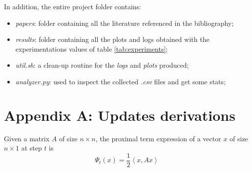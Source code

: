 \documentclass[notitlepage]{article}
\begin{document}
In addition, the entire project folder contains:
\begin{itemize}
  \item \textit{papers}: folder containing all the literature referenced in the bibliography;
  \item \textit{results}: folder containing all the plots and logs obtained with the experimentations values of table \ref{tab:experiments};
  \item \textit{util.sh}: a clean-up routine for the \textit{logs} and \textit{plots} produced;
  \item \textit{analyzer.py}: used to inspect the collected \textit{.csv} files and get some stats;
\end{itemize}


\newpage




\newpage

\appendix

\section{Appendix A: Updates derivations}
\label{sec:appendix}
Given a matrix $A$ of size $n \times n$, the proximal term expression of a vector $x$ of size $n\times 1$ at step $t$ is
\[
  \Psi_t(x) = \frac{1}{2} \left\langle x, A x \right\rangle  
\]
\end{document}
